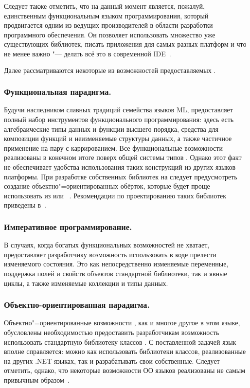Следует также отметить, что на данный момент \fsharp{} является, пожалуй, единственным функциональным языком программирования, который продвигается одним из ведущих производителей в области разработки программного обеспечения.
Он позволяет использовать множество уже существующих библиотек, писать приложения для самых разных платформ и что не менее важно "---
делать всё это в современной IDE~\cite{fsharp_pfp_issue_5}.

Далее рассматриваются некоторые из возможностей предоставляемых \fsharp{}.

\subsubsection{Функциональная парадигма. }
\label{ssub:tech:fsharp_fun}
Будучи наследником славных традиций семейства языков ML, предоставляет полный набор инструментов функционального программирования: здесь есть алгебраические типы данных и функции высшего порядка, средства для композиции функций и неизменяемые структуры данных, а также частичное применение на пару с каррированием. 
Все функциональные возможности \fsharp{} реализованы в конечном итоге поверх общей системы типов \netfx{}.
Однако этот факт не обеспечивает удобства использования таких конструкций из других языков платформы.
При разработке собственных библиотек на \fsharp{} следует
предусмотреть создание объектно"=ориентированных обёрток, которые будет проще использовать из \csharp{} или \vbnet{}~\cite{fsharp_pfp_issue_5}. Рекомендации по проектированию таких библиотек приведены в~\cite{fsdg_2010}.

\subsubsection{Императивное программирование. }
\label{ssub:tech:fsharp_imperative}
В случаях, когда богатых функциональных возможностей не хватает, \fsharp{} предоставляет разработчику возможность использовать в коде прелести изменяемого состояния. 
Это как непосредственно изменяемые переменные, поддержка полей и свойств объектов стандартной библиотеки, так и явные циклы, а также изменяемые коллекции и типы данных.

\subsubsection{Объектно-ориентированная парадигма. }
\label{ssub:tech:fsharp_oop}
Объектно"=ориентированные возможности \fsharp{}, как и многое другое в этом языке, обусловлены необходимостью предоставить разработчикам возможность использовать стандартную библиотеку классов \netfx{}.
С поставленной задачей язык вполне справляется: можно как использовать библиотеки классов, реализованные на других .NET языках, так и разрабатывать свои
собственные.
Следует отметить, однако, что некоторые возможности ОО языков реализованы не
самым привычным образом~\cite{fsharp_pfp_issue_5}.

